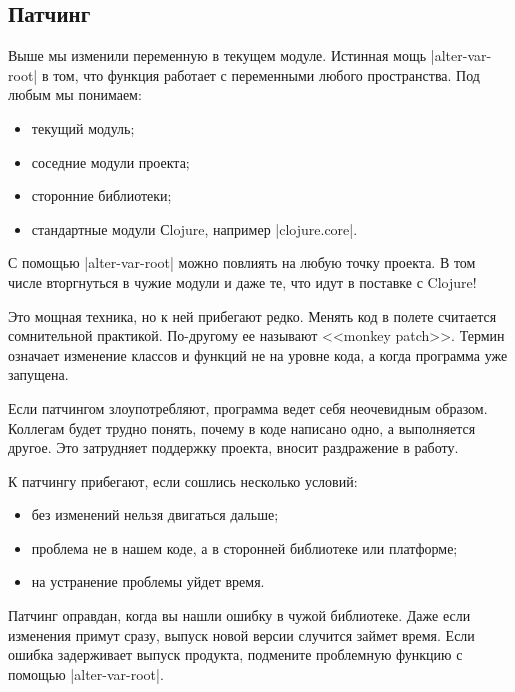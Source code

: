 \subsection{Патчинг}

Выше мы изменили переменную в текущем модуле. Истинная мощь
\spverb|alter-var-root| в том, что функция работает с переменными любого
пространства. Под любым мы понимаем:

\begin{itemize}

\item
  текущий модуль;

\item
  соседние модули проекта;

\item
  сторонние библиотеки;

\item
  стандартные модули Сlojure, например \spverb|clojure.core|.

\end{itemize}

С помощью \spverb|alter-var-root| можно повлиять на любую точку проекта. В том
числе вторгнуться в чужие модули и даже те, что идут в поставке с Clojure!

Это мощная техника, но к ней прибегают редко. Менять код в полете считается
сомнительной практикой. По-другому ее называют <<monkey
patch>>. Термин означает
изменение классов и функций не на уровне кода, а когда программа уже запущена.

Если патчингом злоупотребляют, программа ведет себя неочевидным
образом. Коллегам будет трудно понять, почему в коде написано одно, а
выполняется другое. Это затрудняет поддержку проекта, вносит раздражение в
работу.

К патчингу прибегают, если сошлись несколько условий:

\begin{itemize}

\item
  без изменений нельзя двигаться дальше;

\item
  проблема не в нашем коде, а в сторонней библиотеке или платформе;

\item
  на устранение проблемы уйдет время.

\end{itemize}

Патчинг оправдан, когда вы нашли ошибку в чужой библиотеке. Даже если изменения
примут сразу, выпуск новой версии случится займет время. Если ошибка задерживает
выпуск продукта, подмените проблемную функцию с помощью \spverb|alter-var-root|.

